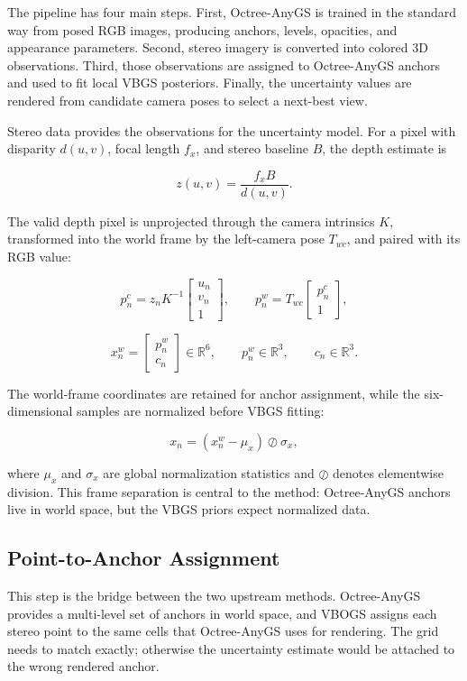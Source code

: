 \documentclass{article}
\begin{document}
The pipeline has four main steps. First, Octree-AnyGS is trained in the standard way from posed RGB images, producing anchors, levels, opacities, and appearance parameters. Second, stereo imagery is converted into colored 3D observations. Third, those observations are assigned to Octree-AnyGS anchors and used to fit local VBGS posteriors. Finally, the uncertainty values are rendered from candidate camera poses to select a next-best view.

Stereo data provides the observations for the uncertainty model. For a pixel with disparity \(d(u,v)\), focal length \(f_x\), and stereo baseline \(B\), the depth estimate is

\[
  z(u,v) = \frac{f_x B}{d(u,v)}.
\]

The valid depth pixel is unprojected through the camera intrinsics \(K\), transformed into the world frame by the left-camera pose \(T_{wc}\), and paired with its RGB value:

\[
  p_n^c = z_n K^{-1}
  \begin{bmatrix}
    u_n \\
    v_n \\
    1
  \end{bmatrix},
  \qquad
  p_n^w = T_{wc}
  \begin{bmatrix}
    p_n^c \\
    1
  \end{bmatrix},
\]

\[
  x_n^w =
  \begin{bmatrix}
    p_n^w \\
    c_n
  \end{bmatrix}
  \in \mathbb{R}^6,
  \qquad
  p_n^w \in \mathbb{R}^3,
  \qquad
  c_n \in \mathbb{R}^3.
\]

The world-frame coordinates are retained for anchor assignment, while the six-dimensional samples are normalized before VBGS fitting:

\[
  x_n =
  (x_n^w - \mu_x) \oslash \sigma_x,
\]

where \(\mu_x\) and \(\sigma_x\) are global normalization statistics and \(\oslash\) denotes elementwise division. This frame separation is central to the method: Octree-AnyGS anchors live in world space, but the VBGS priors expect normalized data.

\subsection{Point-to-Anchor Assignment}
This step is the bridge between the two upstream methods. Octree-AnyGS provides a multi-level set of anchors in world space, and VBOGS assigns each stereo point to the same cells that Octree-AnyGS uses for rendering. The grid needs to match exactly; otherwise the uncertainty estimate would be attached to the wrong rendered anchor.
\end{document}
